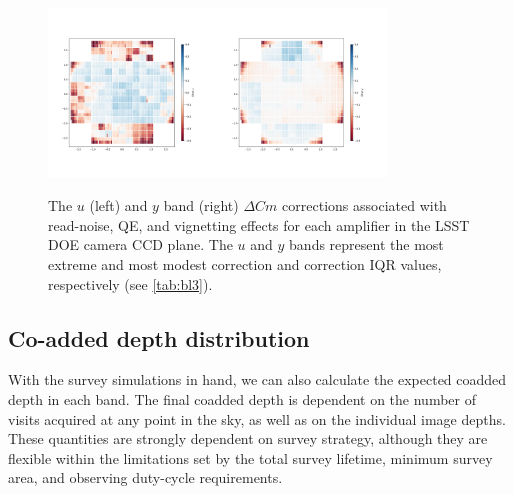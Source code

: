 \documentclass[PST,authoryear,toc]{lsstdoc}
\begin{document}
\begin{figure}[!hb]
    \centering

\includegraphics[width=0.4\textwidth]{figures/u_focal_plane}\includegraphics[width=0.4\textwidth]{figures/y_focal_plane}%
\caption{The $u$ (left) and $y$ band (right) $\Delta Cm$ corrections associated with read-noise, QE, and vignetting effects for each amplifier in the LSST DOE camera CCD plane. The $u$ and $y$ bands represent the most extreme and most modest correction and correction IQR values, respectively (see \autoref{tab:bl3}).}\label{fig:ccdplane}
\end{figure}
 \FloatBarrier





\subsection{Co-added depth distribution}\label{sec:coadd}

With the survey simulations in hand, we can also calculate the expected coadded depth in each band. The final coadded depth is dependent on the number of visits acquired at any point in the sky, as well as on the individual image depths. These quantities are strongly dependent on survey strategy, although they are flexible within the limitations set by the total survey lifetime, minimum survey area, and observing duty-cycle requirements.
\end{document}
